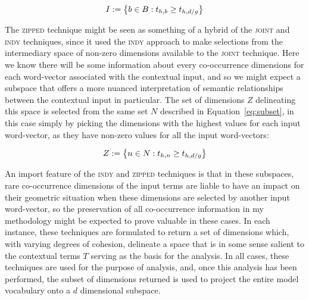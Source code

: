 \begin{equation}
I := \left \{b \in B: t_{h,b} \geq \del{\max_{d/g} t_h} \revJB{28}{t_{h,d/g}} \right \}
\end{equation}

\noindent The \textsc{zipped} technique might be seen as something of a hybrid of the \textsc{joint} and \textsc{indy} techniques, since it used the \textsc{indy} approach to make selections from the intermediary space of non-zero dimensions available to the \textsc{joint} technique.  Here we know there will be some information about every co-occurrence dimensions for each word-vector associated with the contextual input, and so we might expect a subspace that offers a more nuanced interpretation of semantic relationships between the contextual input in particular.  The set of dimensions $Z$ delineating this space is selected from the same set $N$ described in Equation~\ref{eq:subset}, in this case simply by picking the dimensions with the highest values for each input word-vector, as they have non-zero values for all the input word-vectors:

\begin{equation}
Z := \left \{n \in N: t_{h,n} \geq \del{\max_{d/g} t_h} \revJB{28}{t_{h,d/g}} \right \}
\end{equation}

\noindent An import feature of the \textsc{indy} and \textsc{zipped} techniques is that in these subspaces, rare co-occurrence dimensions of the input terms are liable to have an impact on their geometric situation when these dimensions are selected by another input word-vector, so the preservation of all co-occurrence information in my methodology might be expected to prove valuable in these cases.  In each instance, these techniques are formulated to return a set of dimensions which, with varying degrees of cohesion, delineate a space that is in some sense salient to the contextual terms $T$ serving as the basis for the analysis.  In all cases, these techniques are used for the purpose of analysis, and, once this analysis has been performed, the subset of dimensions returned is used to project the entire model vocabulary onto a $d$ dimensional subspace.


